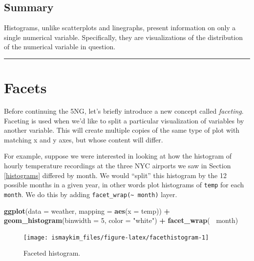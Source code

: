 \documentclass[12pt, krantz2,]{krantz}
\makeatletter
\newenvironment{Shaded}{\begin{snugshade}}{\end{snugshade}}
\newcommand{\DataTypeTok}[1]{\textcolor[rgb]{0.27,0.27,0.27}{#1}}
\newcommand{\DecValTok}[1]{\textcolor[rgb]{0.06,0.06,0.06}{#1}}
\newcommand{\KeywordTok}[1]{\textcolor[rgb]{0.27,0.27,0.27}{\textbf{#1}}}
\newcommand{\NormalTok}[1]{#1}
\newcommand{\OperatorTok}[1]{\textcolor[rgb]{0.43,0.43,0.43}{\textbf{#1}}}
\newcommand{\StringTok}[1]{\textcolor[rgb]{0.5,0.5,0.5}{#1}}
\newenvironment{kframe}{%
\medskip{}
\setlength{\fboxsep}{.8em}
 \def\at@end@of@kframe{}%
 \ifinner\ifhmode%
  \def\at@end@of@kframe{\end{minipage}}%
  \begin{minipage}{\columnwidth}%
 \fi\fi%
 \def\FrameCommand##1{\hskip\@totalleftmargin \hskip-\fboxsep
 \colorbox{shadecolor}{##1}\hskip-\fboxsep
     \hskip-\linewidth \hskip-\@totalleftmargin \hskip\columnwidth}%
 \MakeFramed {\advance\hsize-\width
   \@totalleftmargin\z@ \linewidth\hsize
   \@setminipage}}%
 {\par\unskip\endMakeFramed%
 \at@end@of@kframe}
\renewenvironment{Shaded}{\begin{kframe}}{\end{kframe}}
\makeatother
\begin{document}
\hypertarget{summary-2}{%
\subsection{Summary}\label{summary-2}}

Histograms, unlike scatterplots and linegraphs, present information on only a single numerical variable. Specifically, they are visualizations of the distribution of the numerical variable in question.

\begin{center}\rule{0.5\linewidth}{\linethickness}\end{center}

\hypertarget{facets}{%
\section{Facets}\label{facets}}

Before continuing the 5NG, let's briefly introduce a new concept called \emph{faceting}. Faceting is used when we'd like to split a particular visualization of variables by another variable. This will create multiple copies of the same type of plot with matching x and y axes, but whose content will differ.

For example, suppose we were interested in looking at how the histogram of hourly temperature recordings at the three NYC airports we saw in Section \ref{histograms} differed by month. We would ``split'' this histogram by the 12 possible months in a given year, in other words plot histograms of \texttt{temp} for each \texttt{month}. We do this by adding \texttt{facet\_wrap(\textasciitilde{}\ month)} layer.

\begin{Shaded}
\begin{Highlighting}[]
\KeywordTok{ggplot}\NormalTok{(}\DataTypeTok{data =}\NormalTok{ weather, }\DataTypeTok{mapping =} \KeywordTok{aes}\NormalTok{(}\DataTypeTok{x =}\NormalTok{ temp)) }\OperatorTok{+}
\StringTok{  }\KeywordTok{geom_histogram}\NormalTok{(}\DataTypeTok{binwidth =} \DecValTok{5}\NormalTok{, }\DataTypeTok{color =} \StringTok{"white"}\NormalTok{) }\OperatorTok{+}
\StringTok{  }\KeywordTok{facet_wrap}\NormalTok{(}\OperatorTok{~}\StringTok{ }\NormalTok{month)}
\end{Highlighting}
\end{Shaded}

\begin{figure}

{\centering \texttt{[image: ismaykim\_files/figure-latex/facethistogram-1]} 

}

\caption{Faceted histogram.}\label{fig:facethistogram}
\end{figure}
\end{document}
